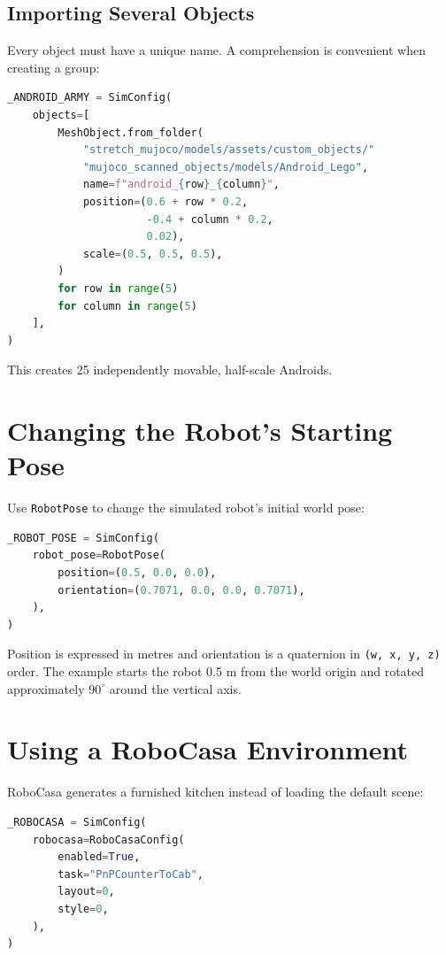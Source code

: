 \documentclass[11pt,a4paper]{article}
\begin{document}
\subsection{Importing Several Objects}

Every object must have a unique name. A comprehension is convenient when
creating a group:

\begin{lstlisting}[language=Python]
_ANDROID_ARMY = SimConfig(
    objects=[
        MeshObject.from_folder(
            "stretch_mujoco/models/assets/custom_objects/"
            "mujoco_scanned_objects/models/Android_Lego",
            name=f"android_{row}_{column}",
            position=(0.6 + row * 0.2,
                      -0.4 + column * 0.2,
                      0.02),
            scale=(0.5, 0.5, 0.5),
        )
        for row in range(5)
        for column in range(5)
    ],
)
\end{lstlisting}

This creates 25 independently movable, half-scale Androids.

\section{Changing the Robot's Starting Pose}

Use \texttt{RobotPose} to change the simulated robot's initial world pose:

\begin{lstlisting}[language=Python]
_ROBOT_POSE = SimConfig(
    robot_pose=RobotPose(
        position=(0.5, 0.0, 0.0),
        orientation=(0.7071, 0.0, 0.0, 0.7071),
    ),
)
\end{lstlisting}

Position is expressed in metres and orientation is a quaternion in
\texttt{(w, x, y, z)} order. The example starts the robot 0.5 m from the world
origin and rotated approximately $90^\circ$ around the vertical axis.

\section{Using a RoboCasa Environment}

RoboCasa generates a furnished kitchen instead of loading the default scene:

\begin{lstlisting}[language=Python]
_ROBOCASA = SimConfig(
    robocasa=RoboCasaConfig(
        enabled=True,
        task="PnPCounterToCab",
        layout=0,
        style=0,
    ),
)
\end{lstlisting}
\end{document}
